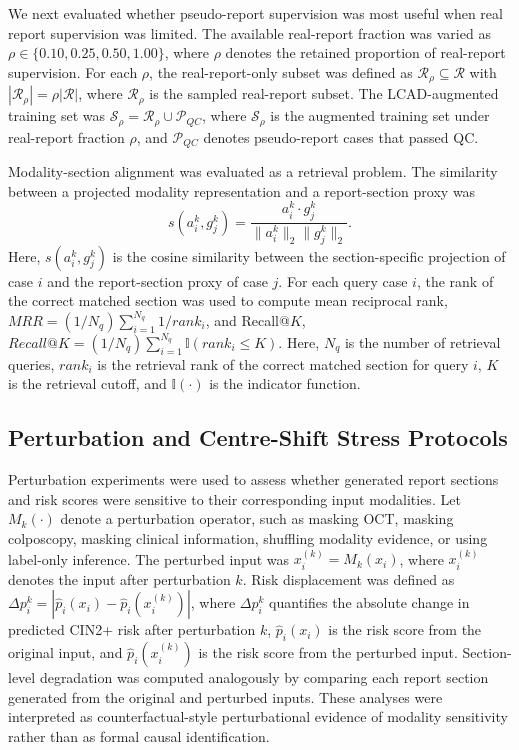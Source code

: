 \documentclass[11pt, a4paper]{article}
\theoremstyle{plain}
\theoremstyle{definition}
\begin{document}
We next evaluated whether pseudo-report supervision was most useful when real report supervision was limited. The available real-report fraction was varied as \(\rho\in\{0.10,0.25,0.50,1.00\}\), where \(\rho\) denotes the retained proportion of real-report supervision. For each \(\rho\), the real-report-only subset was defined as \(\mathcal{R}_{\rho}\subseteq\mathcal{R}\) with \(|\mathcal{R}_{\rho}|=\rho|\mathcal{R}|\), where \(\mathcal{R}_{\rho}\) is the sampled real-report subset. The LCAD-augmented training set was \(\mathcal{S}_{\rho}=\mathcal{R}_{\rho}\cup\mathcal{P}_{QC}\), where \(\mathcal{S}_{\rho}\) is the augmented training set under real-report fraction \(\rho\), and \(\mathcal{P}_{QC}\) denotes pseudo-report cases that passed QC.

Modality-section alignment was evaluated as a retrieval problem. The similarity between a projected modality representation and a report-section proxy was
\begin{equation}
s(a_i^k,g_j^k)
=
\frac{a_i^k\cdot g_j^k}
{\|a_i^k\|_2\|g_j^k\|_2}.
\end{equation}
Here, \(s(a_i^k,g_j^k)\) is the cosine similarity between the section-specific projection of case \(i\) and the report-section proxy of case \(j\). For each query case \(i\), the rank of the correct matched section was used to compute mean reciprocal rank, \(MRR=(1/N_q)\sum_{i=1}^{N_q}1/rank_i\), and Recall@\(K\), \(Recall@K=(1/N_q)\sum_{i=1}^{N_q}\mathbb{I}(rank_i\leq K)\). Here, \(N_q\) is the number of retrieval queries, \(rank_i\) is the retrieval rank of the correct matched section for query \(i\), \(K\) is the retrieval cutoff, and \(\mathbb{I}(\cdot)\) is the indicator function.

\subsection{Perturbation and Centre-Shift Stress Protocols}
\label{subsec:methods_perturbation_loco}

Perturbation experiments were used to assess whether generated report sections and risk scores were sensitive to their corresponding input modalities. Let \(M_k(\cdot)\) denote a perturbation operator, such as masking OCT, masking colposcopy, masking clinical information, shuffling modality evidence, or using label-only inference. The perturbed input was \(x_i^{(k)}=M_k(x_i)\), where \(x_i^{(k)}\) denotes the input after perturbation \(k\). Risk displacement was defined as \(\Delta p_i^{k}=|\hat{p}_i(x_i)-\hat{p}_i(x_i^{(k)})|\), where \(\Delta p_i^k\) quantifies the absolute change in predicted CIN2+ risk after perturbation \(k\), \(\hat{p}_i(x_i)\) is the risk score from the original input, and \(\hat{p}_i(x_i^{(k)})\) is the risk score from the perturbed input. Section-level degradation was computed analogously by comparing each report section generated from the original and perturbed inputs. These analyses were interpreted as counterfactual-style perturbational evidence of modality sensitivity rather than as formal causal identification.
\end{document}
